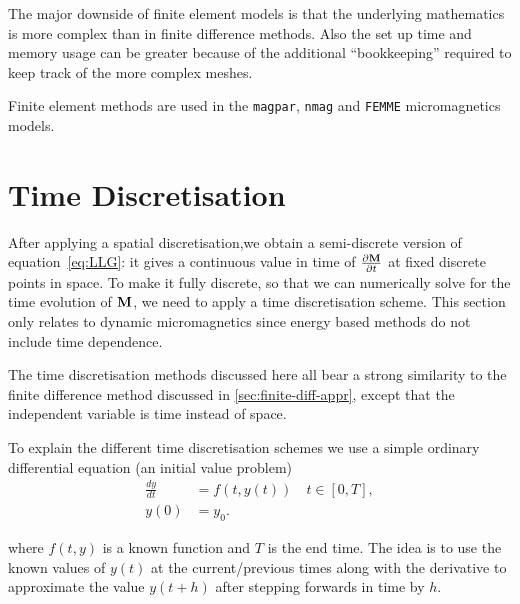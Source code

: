 The major downside of finite element models is that the underlying mathematics is more complex than in finite difference methods.
Also the set up time and memory usage can be greater because of the additional ``bookkeeping'' required to keep track of the more complex meshes.

Finite element methods are used in the \texttt{magpar}\cite{Scholz2003}, \texttt{nmag}\cite{Fischbacher2007} and \texttt{FEMME} micromagnetics models\cite{suessco-website}.



\section{Time Discretisation}
\label{sec:time-discretisation}

After applying a spatial discretisation,we obtain a semi-discrete version of  equation~\eqref{eq:LLG}: it gives a continuous value in time of $\frac{\partial \mathbf{M}}{\partial t}$ at fixed discrete points in space. To make it fully discrete, so that we can numerically solve for the time evolution of $\mathbf{M}$, we need to apply a time discretisation scheme. This section only relates to dynamic micromagnetics since energy based methods do not include time dependence.

The time discretisation methods discussed here all bear a strong similarity to the finite difference method discussed in \autoref{sec:finite-diff-appr}, except that the independent variable is time instead of space.

To explain the different time discretisation schemes we use a simple ordinary differential equation (an initial value problem)
\begin{equation}
  \begin{aligned}
    \frac{dy}{dt} &= f(t,y(t)) \quad t \in [0,T], \\
    y(0) &= y_0.
    \label{eq:45}
  \end{aligned}
\end{equation}

where $f(t,y)$ is a known function and $T$ is the end time. The idea is to use the known values of $y(t)$ at the current/previous times along with the derivative to approximate the value $y(t+h)$  after stepping forwards in time by $h$.

